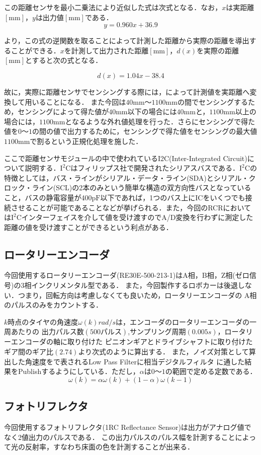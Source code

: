 この距離センサを最小二乗法により近似した式は次式となる．なお，$x$は実距離$\mathrm{[mm]}$，$y$は出力値$\mathrm{[mm]}$である．
\begin{equation}
  y = 0.960x + 36.9  \label{eq::1pf}
\end{equation}

より，この式の逆関数を取ることによって計測した距離から実際の距離を導出することができる．$x$を計測して出力された距離$\mathrm{[mm]}$，$d(x)$を実際の距離$\mathrm{[mm]}$とすると次の式となる．

\begin{equation}
  d(x) = 1.04x - 38.4 \label{eq::2pf}
\end{equation}

故に，実際に距離センサでセンシングする際には，によって計測値を実距離へ変換して用いることになる．
また今回は$40\mathrm{mm}$〜$1100\mathrm{mm}$の間でセンシングするため，センシングによって得た値が$40\mathrm{mm}$以下の場合には$40\mathrm{mm}$と，$1100\mathrm{mm}$以上の場合には，$1100\mathrm{mm}$となるような外れ値処理を行った．さらにセンシングで得た値を$0〜1$の間の値で出力するために，センシングで得た値をセンシングの最大値$1100\mathrm{mm}$で割るという正規化処理を施した．

ここで距離センサモジュールの中で使われているI2C(Inter-Integrated Circuit)について説明する．$\mathrm{I^{2}C}$はフィリップス社で開発されたシリアスバスである．$\mathrm{I^{2}C}$の特徴としては，バス・ラインがシリアル・データ・ライン(SDA)とシリアル・クロック・ライン(SCL)の2本のみという簡単な構造の双方向性バスとなっていること，バスの静電容量が400$\mathrm{pF}$以下であれば，1つのバス上にICをいくつでも接続させることが可能であることなどが挙げられる．また，今回のRCRにおいては$\mathrm{I^{2}C}$インターフェイスを介して値を受け渡すのでA/D変換を行わずに測定した距離の値を受け渡すことができるという利点がある\cite{i2c}．

\subsection{ロータリーエンコーダ}
今回使用するロータリーエンコーダ(RE30E-500-213-1)はA相，B相，Z相(ゼロ信号)の3相インクリメンタル型である．
また，今回製作するロボカーは後退しない．つまり，回転方向は考慮しなくても良いため，ロータリーエンコーダの
A相のパルスのみをカウントする．

$k$時点のタイヤの角速度$\omega(k)\unit{rad/s}$は，エンコーダのロータリーエンコーダの一周あたりの
出力パルス数$(500パルス)$,サンプリング周期$(0.005\unit{s})$，ロータリーエンコーダの軸に取り付けた
ピニオンギアとドライブシャフトに取り付けたギア間のギア比$(2.74)$より次式のように算出する．
また，ノイズ対策として算出した角速度をで表されるLow Pass Filterに相当デジタルフィルタ
に通した結果をPublishするようにしている．ただし，$\alpha$は$0〜1$の範囲で定める定数である．\\
      \begin{equation}
      	\omega(k)=\alpha\omega(k)+(1-\alpha)\omega(k-1) \label{eq::lpf}
      \end{equation}

\subsection{フォトリフレクタ}
今回使用するフォトリフレクタ(1RC Reflectance Sensor)は出力がアナログ値でなく2値出力のパルスである．
この出力パルスのパルス幅を計測することによって光の反射率，すなわち床面の色を計測することが出来る．
